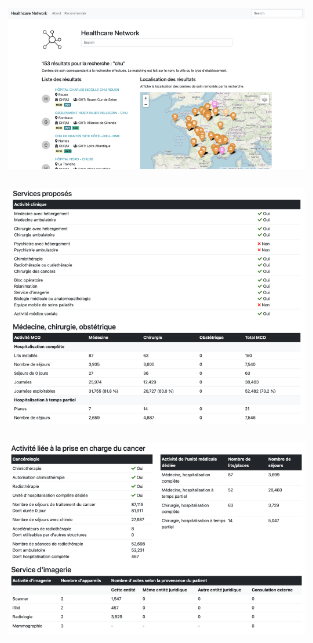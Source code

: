\begin{figure}[H]
    \includegraphics[width=0.7\textwidth]{images/healthcare-network/search.png}
    \centering
    \caption{}
    \label{fig:hn-search}
\end{figure}


\begin{figure}[H]
    \includegraphics[width=0.7\textwidth]{images/healthcare-network/curie-services.png}
    \centering
    \caption{}
    \label{fig:hn-curie-services}
\end{figure}


\begin{figure}[H]
    \includegraphics[width=0.7\textwidth]{images/healthcare-network/curie-cancero.png}
    \centering
    \caption{}
    \label{fig:hn-curie-cancero}
\end{figure}


